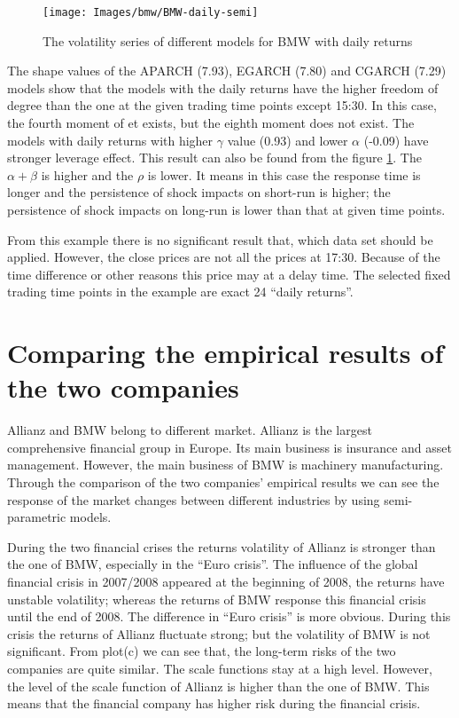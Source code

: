 \begin{figure}[!htbp]
	\centering
	\texttt{[image: Images/bmw/BMW-daily-semi]}
	\caption[The volatility series of different models for BMW with daily returns]{The volatility series of different models for BMW with daily returns}
	\label{fig:BMWdailysemi}
\end{figure}


The shape values of the APARCH (7.93), EGARCH (7.80) and CGARCH (7.29) models show that the models with the daily returns have the higher freedom of degree than the one at the given trading time points except 15:30. In this case, the fourth moment of et exists, but the eighth moment does not exist. The models with daily returns with higher $\gamma$ value (0.93) and lower $\alpha$ (-0.09) have stronger leverage effect. This result can also be found from the figure \ref{fig:BMWdailysemi}. The $\alpha + \beta$ is higher and the $\rho$ is lower. It means in this case the response time is longer and the persistence of shock impacts on short-run is higher; the persistence of shock impacts on long-run is lower than that at given time points.


From this example there is no significant result that, which data set should be applied. However, the close prices are not all the prices at 17:30. Because of the time difference or other reasons this price may at a delay time. The selected fixed trading time points in the example are exact 24 ``daily returns''.



\section{Comparing the empirical results of the two companies}

Allianz and BMW belong to different market. Allianz is the largest comprehensive financial group in Europe. Its main business is insurance and asset management. However, the main business of BMW is machinery manufacturing. Through the comparison of the two companies' empirical results we can see the response of the market changes between different industries by using semi-parametric models.

During the two financial crises the returns volatility of Allianz is stronger than the one of BMW, especially in the ``Euro crisis''. The influence of the global financial crisis in 2007/2008 appeared at the beginning of 2008, the returns have unstable volatility; whereas the returns of BMW response this financial crisis until the end of 2008. The difference in ``Euro crisis'' is more obvious. During this crisis the returns of Allianz fluctuate strong; but the volatility of BMW is not significant. From plot(c) we can see that, the long-term risks of the two companies are quite similar. The scale functions stay at a high level. However, the level of the scale function of Allianz is higher than the one of BMW. This means that the financial company has higher risk during the financial crisis.

